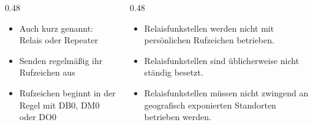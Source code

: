 \begin{frame}
\begin{columns}[T]
    \begin{column}{0.48\textwidth}
    \begin{itemize}
  \item Auch kurz genannt: Relais oder Repeater
  \item Senden regelmäßig ihr Rufzeichen aus
  \item Rufzeichen beginnt in der Regel mit DB0, DM0 oder DO0
  \end{itemize}

    \end{column}
    \pause
    
   \begin{column}{0.48\textwidth}
       \begin{itemize}
  \item Relaisfunkstellen werden nicht mit persönlichen Rufzeichen betrieben.
  \item Relaisfunkstellen sind üblicherweise nicht ständig besetzt.
  \item Relaisfunkstellen müssen nicht zwingend an geografisch exponierten Standorten betrieben werden.
  \end{itemize}

   \end{column}
\end{columns}



\end{frame}

